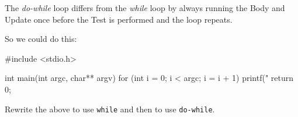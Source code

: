 The \emph{do-while} loop differs from the \emph{while} loop by always running the Body and Update once before the Test is performed and the loop repeats.

So we could do this:
\begin{codeblock}
#include <stdio.h>

int main(int argc, char** argv) {
    for (int i = 0; i < argc; i = i + 1) {
        printf("%
    }
    return 0;
}
\end{codeblock}

\begin{exercise}
Rewrite the above to use \texttt{while} and then to use \texttt{do-while}. 
\end{exercise}

